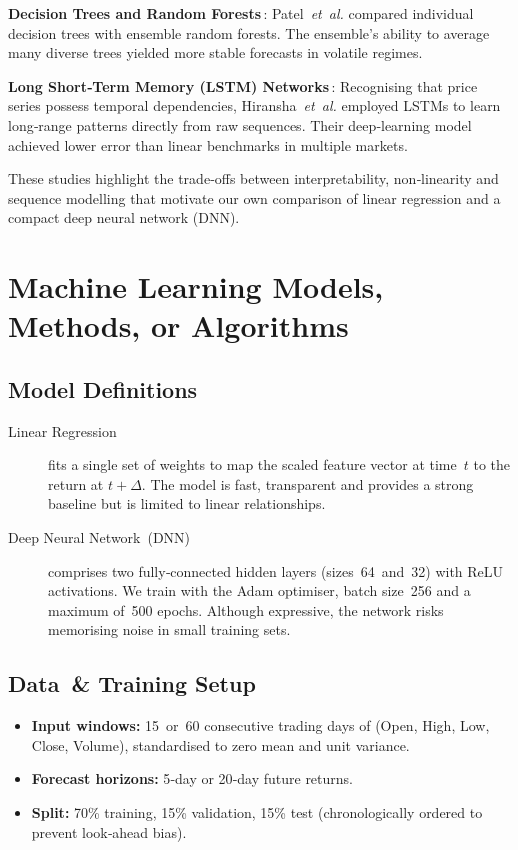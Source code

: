 \documentclass[sigconf]{acmart}
\begin{document}
\textbf{Decision Trees and Random Forests}\,\cite{patel2015rf}:  Patel \textit{et al.} compared individual decision trees with ensemble random forests.  The ensemble’s ability to average many diverse trees yielded more stable forecasts in volatile regimes.

\textbf{Long Short‑Term Memory (LSTM) Networks}\,\cite{hiransha2018lstm}:  Recognising that price series possess temporal dependencies, Hiransha \textit{et al.} employed LSTMs to learn long‑range patterns directly from raw sequences.  Their deep‑learning model achieved lower error than linear benchmarks in multiple markets.

These studies highlight the trade‑offs between interpretability, non‑linearity and sequence modelling that motivate our own comparison of linear regression and a compact deep neural network (DNN).

\section{Machine Learning Models, Methods, or Algorithms}
\subsection{Model Definitions}
\begin{description}
  \item[Linear Regression] fits a single set of weights to map the scaled feature vector at time $t$ to the return at $t{+}\Delta$.  The model is fast, transparent and provides a strong baseline but is limited to linear relationships.
  \item[Deep Neural Network (DNN)] comprises two fully‑connected hidden layers (sizes 64 and 32) with ReLU activations.  We train with the Adam optimiser, batch size 256 and a maximum of 500 epochs.  Although expressive, the network risks memorising noise in small training sets.
\end{description}

\subsection{Data \& Training Setup}
\begin{itemize}
  \item \textbf{Input windows:} 15 or 60 consecutive trading days of (Open, High, Low, Close, Volume), standardised to zero mean and unit variance.
  \item \textbf{Forecast horizons:} 5‑day or 20‑day future returns.
  \item \textbf{Split:} 70\% training, 15\% validation, 15\% test (chronologically ordered to prevent look‑ahead bias).
\end{itemize}
\end{document}
